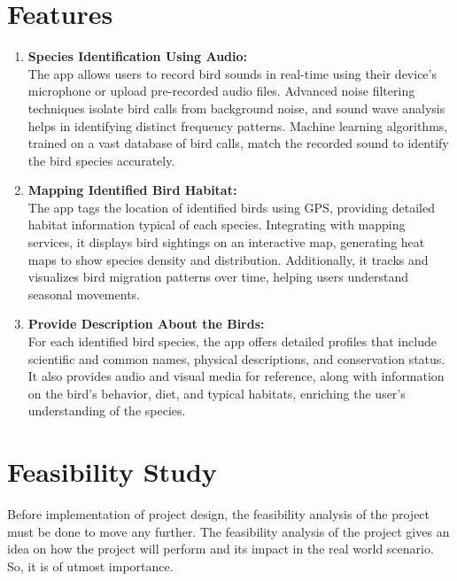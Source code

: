 \section{Features}
\begin{enumerate}
    \item \textbf{Species Identification Using Audio:}\\
          The app allows users to record bird sounds in real-time using their
          device's microphone or
          upload pre-recorded audio files. Advanced noise filtering techniques
          isolate bird calls from
          background noise, and sound wave analysis helps in identifying
          distinct frequency patterns.
          Machine learning algorithms, trained on a vast database of bird
          calls, match the recorded
          sound to identify the bird species accurately.

    \item \textbf{Mapping Identified Bird Habitat:}\\
          The app tags the location of identified birds using GPS, providing
          detailed habitat information
          typical of each species. Integrating with mapping services, it
          displays bird sightings on an
          interactive map, generating heat maps to show species density and
          distribution. Additionally,
          it tracks and visualizes bird migration patterns over time, helping
          users understand seasonal
          movements.

    \item \textbf{Provide Description About the Birds:}\\
          For each identified bird species, the app offers detailed profiles
          that include scientific and
          common names, physical descriptions, and conservation status. It also
          provides audio and visual
          media for reference, along with information on the bird's behavior,
          diet, and typical habitats,
          enriching the user's understanding of the species.

\end{enumerate}
\section{Feasibility Study}
Before implementation of project design, the feasibility analysis of the
project must be done to move any further. The feasibility analysis of the
project gives an idea on how the project will perform and its impact in the
real world scenario. So, it is of utmost importance.

